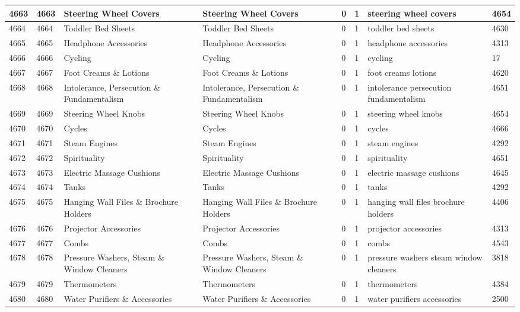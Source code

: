 \begin{longtable}{|l|l|l|l|l|l|l|l|}
4663 & 4663 & Steering Wheel Covers & Steering Wheel Covers & 0 & 1 & steering wheel covers & 4654 \\ \hline 
4664 & 4664 & Toddler Bed Sheets & Toddler Bed Sheets & 0 & 1 & toddler bed sheets & 4630 \\ \hline 
4665 & 4665 & Headphone Accessories & Headphone Accessories & 0 & 1 & headphone accessories & 4313 \\ \hline 
4666 & 4666 & Cycling & Cycling & 0 & 1 & cycling & 17 \\ \hline 
4667 & 4667 & Foot Creams \& Lotions & Foot Creams \& Lotions & 0 & 1 & foot creams lotions & 4620 \\ \hline 
4668 & 4668 & Intolerance, Persecution \& Fundamentalism & Intolerance, Persecution \& Fundamentalism & 0 & 1 & intolerance persecution fundamentalism & 4651 \\ \hline 
4669 & 4669 & Steering Wheel Knobs & Steering Wheel Knobs & 0 & 1 & steering wheel knobs & 4654 \\ \hline 
4670 & 4670 & Cycles & Cycles & 0 & 1 & cycles & 4666 \\ \hline 
4671 & 4671 & Steam Engines & Steam Engines & 0 & 1 & steam engines & 4292 \\ \hline 
4672 & 4672 & Spirituality & Spirituality & 0 & 1 & spirituality & 4651 \\ \hline 
4673 & 4673 & Electric Massage Cushions & Electric Massage Cushions & 0 & 1 & electric massage cushions & 4645 \\ \hline 
4674 & 4674 & Tanks & Tanks & 0 & 1 & tanks & 4292 \\ \hline 
4675 & 4675 & Hanging Wall Files \& Brochure Holders & Hanging Wall Files \& Brochure Holders & 0 & 1 & hanging wall files brochure holders & 4406 \\ \hline 
4676 & 4676 & Projector Accessories & Projector Accessories & 0 & 1 & projector accessories & 4313 \\ \hline 
4677 & 4677 & Combs & Combs & 0 & 1 & combs & 4543 \\ \hline 
4678 & 4678 & Pressure Washers, Steam \& Window Cleaners & Pressure Washers, Steam \& Window Cleaners & 0 & 1 & pressure washers steam window cleaners & 3818 \\ \hline 
4679 & 4679 & Thermometers & Thermometers & 0 & 1 & thermometers & 4384 \\ \hline 
4680 & 4680 & Water Purifiers \& Accessories & Water Purifiers \& Accessories & 0 & 1 & water purifiers accessories & 2500 \\ \hline 

\end{longtable}

